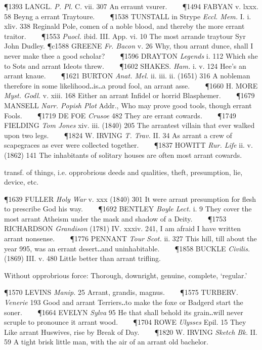 \begin{description}[wide, labelwidth=!, labelindent=0pt]
\begin{myenumerate}
\P 1393 LANGL.  \textit{P. Pl.} C. vii. 307 An erraunt vsurer.    
\P 1494 FABYAN  v. lxxx. 58 Beyng a errant Traytoure.    
\P 1538 TUNSTALL in Strype \textit{Eccl. Mem.} I. i. xliv. 338 Reginald Pole, comen of a noble blood, and thereby the more errant traitor.    
\P 1553 \textit{Puocl.} ibid. III. App. vi. 10 The most arrande traytour Syr John Dudley.
\P c1588 GREENE  \textit{Fr. Bacon} v. 26 Why, thou arrant dunce, shall I never make thee a good scholar?    
\P 1596 DRAYTON  \textit{Legends} i. 112 Which she to Sots and arrant Ideots threw.    
\P 1602 SHAKES.  \textit{Ham.} i. v. 124 Hee's an arrant knaue.    
\P 1621 BURTON  \textit{Anat. Mel.} ii. iii. ii. (1651) 316 A nobleman therefore in some likelihood‥is‥a proud fool, an arrant asse.    
\P 1660 H. MORE  \textit{Myst. Godl.} v. xiii. 168 Either an arrant Infidel or horrid Blasphemer.    
\P 1679 MANSELL  \textit{Narr. Popish Plot} Addr., Who may prove good tools, though errant Fools.    
\P 1719 DE FOE  \textit{Crusoe} 482 They are errant cowards.    
\P 1749 FIELDING  \textit{Tom Jones} xiv. iii. (1840) 205 The arrantest villain that ever walked upon two legs.    
\P 1824 W. IRVING  \textit{T. Trav.} II. 34 As arrant a crew of scapegraces as ever were collected together.    
\P 1837 HOWITT  \textit{Rur. Life} ii. v. (1862) 141 The inhabitants of solitary houses are often most arrant cowards.

 transf. of things, i.e. opprobrious deeds and qualities, theft, presumption, lie, device, etc.

\P 1639 FULLER  \textit{Holy War} v. xxx (1840) 301 It were arrant presumption for flesh to prescribe God his way.    
\P 1692 BENTLEY  \textit{Boyle Lect.} i. 9 They cover the most arrant Atheism under the mask and shadow of a Deity.    
\P 1753 RICHARDSON  \textit{Grandison} (1781) IV. xxxiv. 241, I am afraid I have written arrant nonsense.    
\P 1776 PENNANT  \textit{Tour Scot.} ii. 327 This hill, till about the year 995, was an errant desert‥and uninhabitable.    
\P 1858 BUCKLE  \textit{Civilis.} (1869) III. v. 480 Little better than arrant trifling.

 Without opprobrious force: Thorough, downright, genuine, complete, ‘regular.’

\P 1570 LEVINS  \textit{Manip.} 25 Arrant, grandis, magnus.    
\P 1575 TURBERV.  \textit{Venerie} 193 Good and arrant Terriers‥to make the foxe or Badgerd start the soner.    
\P 1664 EVELYN  \textit{Sylva} 95 He that shall behold its grain‥will never scruple to pronounce it arrant wood.    
\P 1704 ROWE  \textit{Ulysses} Epil. 15 They Like arrant Huswives, rise by Break of Day.    
\P 1820 W. IRVING  \textit{Sketch Bk.} II. 59 A tight brisk little man, with the air of an arrant old bachelor.


\end{myenumerate}
\end{description}
